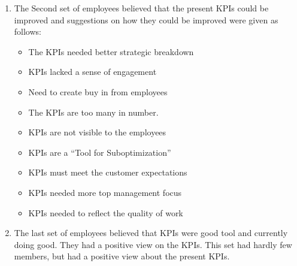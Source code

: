 \begin{enumerate}
\begin{enumerate}
    \item The Second set of employees believed that the present KPIs could be improved and suggestions on how they could be improved were given as follows:\\
    \begin{itemize}
    \item The KPIs needed better strategic breakdown\\
    \item KPIs lacked a sense of engagement\\
    \item Need to create buy in from employees \\
    \item The KPIs are too many in number. \\
    \item KPIs are not visible to the employees\\
    \item KPIs are a “Tool for Suboptimization” \\
    \item KPIs must meet the customer expectations\\
    \item KPIs needed more top management focus \\
    \item KPIs needed to reflect the quality of work \\

    \end{itemize}
    \item The last set of employees believed that KPIs were good tool and currently doing good. They had a positive view on the KPIs. This set had hardly few members, but had a positive view about the present KPIs.\\
\end{enumerate}


\end{enumerate}
